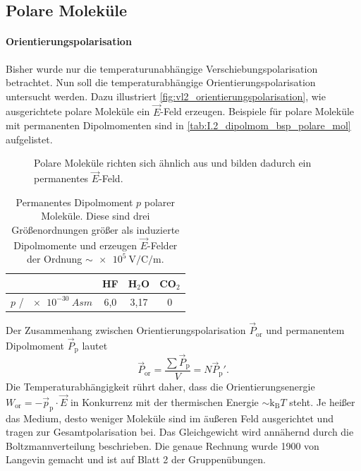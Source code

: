 \subsection{Polare Moleküle}
\paragraph{Orientierungspolarisation}
    Bisher wurde nur die temperaturunabhängige Verschiebungspolarisation betrachtet. Nun soll die temperaturabhängige Orientierungspolarisation untersucht werden. Dazu illustriert \autoref{fig:vl2_orientierungspolarisation}, wie ausgerichtete polare Moleküle ein $\vec E$-Feld erzeugen. Beispiele für polare Moleküle mit permanenten Dipolmomenten sind in \autoref{tab:I.2_dipolmom_bsp_polare_mol} aufgelistet.
    \begin{figure}[H]
        \centering
        \caption{Polare Moleküle richten sich ähnlich aus und bilden dadurch ein permanentes $\vec E$-Feld.}
        \label{fig:vl2_orientierungspolarisation}
    \end{figure}
    \vspace{-0.5cm}
    \begin{table}[H]
        \centering
        \caption{Permanentes Dipolmoment $p$ polarer Moleküle. Diese sind drei Größenordnungen größer als induzierte Dipolmomente und erzeugen $\vec E$-Felder der Ordnung $\sim\SI{e5}{\volt\per\coulomb\per\meter}$.}
        \begin{tabular}{|l||ccc|}\hline
             &HF&H${}_2$O&CO${}_2$  \\\hline
             $p$ / $\SI{e-30}{Asm}$&6,0&3,17&0 \\\hline
        \end{tabular}
        \label{tab:I.2_dipolmom_bsp_polare_mol}
    \end{table}
    Der Zusammenhang zwischen Orientierungspolarisation $\vec P_\text{or}$ und permanentem Dipolmoment $\vec P_\text{p}$ lautet
    $$
    \vec{P}_{\text{or}} = \frac{ \sum \vec{P}_{\text{p}}}{ V} = N \vec{P}_\text{p}'.
    $$ 
    Die Temperaturabhängigkeit rührt daher, dass die Orientierungsenergie $W_{\text{or}}= - \vec{p}_\text{p}\cdot\vec{E}$ in Konkurrenz mit der thermischen Energie $ \sim \mathrm{k}_{\mathrm{B}} T$ steht. Je heißer das Medium, desto weniger Moleküle sind im äußeren Feld ausgerichtet und tragen zur Gesamtpolarisation bei. Das Gleichgewicht wird annähernd durch die Boltzmannverteilung beschrieben. Die genaue Rechnung wurde 1900 von Langevin gemacht und ist auf Blatt 2 der Gruppenübungen.\\
    
